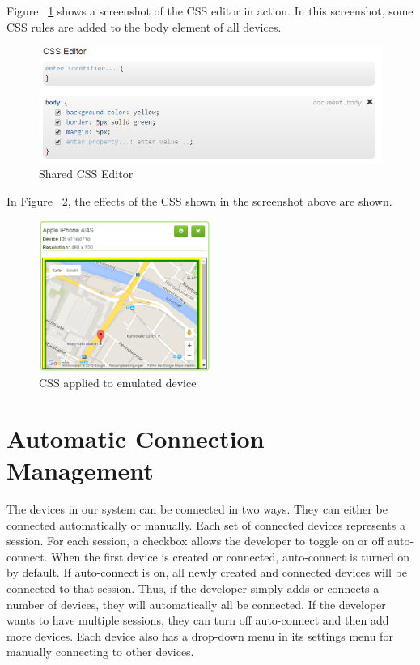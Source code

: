 Figure ~\ref{fig:css_editor} shows a screenshot of the CSS editor in action. In this screenshot, some CSS rules are added to the body element of all devices.

\begin{figure}[H]
  \centering
    \includegraphics[width=1.0\textwidth]{images/screenshots/css_editor.png}
	\caption{Shared CSS Editor}
	\label{fig:css_editor}
\end{figure}

In Figure ~\ref{fig:css_applied}, the effects of the CSS shown in the screenshot above are shown. 

\begin{figure}[H]
  \centering
    \includegraphics[width=0.5\textwidth]{images/screenshots/emulated_device_4.png}
	\caption{CSS applied to emulated device}
	\label{fig:css_applied}
\end{figure}

\section{Automatic Connection Management}

The devices in our system can be connected in two ways. They can either be connected automatically or manually. Each set of connected devices represents a session. For each session, a checkbox allows the developer to toggle on or off auto-connect. When the first device is created or connected, auto-connect is turned on by default. If auto-connect is on, all newly created and connected devices will be connected to that session. Thus, if the developer simply adds or connects a number of devices, they will automatically all be connected. If the developer wants to have multiple sessions, they can turn off auto-connect and then add more devices. Each device also has a drop-down menu in its settings menu for manually connecting to other devices. 

